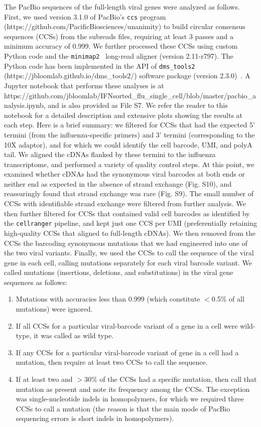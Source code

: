 \documentclass[]{article}
\begin{document}
The PacBio sequences of the full-length viral genes were analyzed as follows.
First, we used version 3.1.0 of PacBio's \texttt{ccs} program (https://github.com/PacificBiosciences/unanimity) to build circular consensus sequences (CCSs) from the subreads files, requiring at least 3 passes and a minimum accuracy of 0.999.
We further processed these CCSs using custom Python code and the \texttt{minimap2}~\cite{li2018minimap2} long-read aligner (version 2.11-r797).
The Python code has been implemented in the API of \texttt{dms\_tools2} (https://jbloomlab.github.io/dms\_tools2/) software package (version 2.3.0)~\cite{bloom2015software}.
A Jupyter notebook that performs these analyses is at https://github.com/jbloomlab/IFNsorted\_flu\_single\_cell/blob/master/pacbio\_analysis.ipynb, and is also provided as File S7.
We refer the reader to this notebook for a detailed description and extensive plots showing the results at each step.
Here is a brief summary: we filtered for CCSs that had the expected 5' termini (from the influenza-specific primers) and 3' termini (corresponding to the 10X adaptor), and for which we could identify the cell barcode, UMI, and polyA tail.
We aligned the cDNAs flanked by these termini to the influenza transcriptome, and performed a variety of quality control steps.
At this point, we examined whether cDNAs had the synonymous viral barcodes at both ends or neither end as expected in the absence of strand exchange (Fig. S10), and reassuringly found that strand exchange was rare (Fig. S9).
The small number of CCSs with identifiable strand exchange were filtered from further analysis.
We then further filtered for CCSs that contained valid cell barcodes as identified by the \texttt{cellranger} pipeline, and kept just one CCS per UMI (preferentially retaining high-quality CCSs that aligned to full-length cDNAs).
We then removed from the CCSs the barcoding synonymous mutations that we had engineered into one of the two viral variants.
Finally, we used the CCSs to call the sequence of the viral gene in each cell, calling mutations separately for each viral barcode variant.
We called mutations (insertions, deletions, and substitutions) in the viral gene sequences as follows:
\begin{enumerate}
\item Mutations with accuracies less than 0.999 (which constitute $<$0.5\% of all mutations) were ignored.
\item If all CCSs for a particular viral-barcode variant of a gene in a cell were wild-type, it was called as wild type.
\item If any CCSs for a particular viral-barcode variant of gene in a cell had a mutation, then require at least two CCSs to call the sequence.
\item If at least two and $>$30\% of the CCSs had a specific mutation, then call that mutation as present and note its frequency among the CCSs. The exception was single-nucleotide indels in homopolymers, for which we required three CCSs to call a mutation (the reason is that the main mode of PacBio sequencing errors is short indels in homopolymers).
\end{enumerate}
\end{document}
